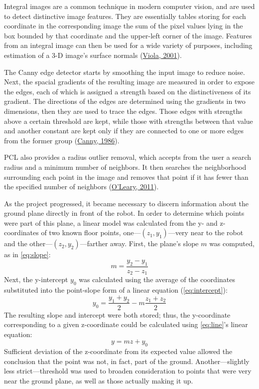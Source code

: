 \documentclass[12pt]{report}
\begin{document}
Integral images are a common technique in modern computer vision, and are used to detect distinctive image features.  They are essentially tables storing for each coordinate in the corresponding image the sum of the pixel values lying in the box bounded by that coordinate and the upper-left corner of the image.  Features from an integral image can then be used for a wide variety of purposes, including estimation of a 3-D image's surface normals (\hyperref[bib:viola]{Viola, 2001}).

The Canny edge detector starts by smoothing the input image to reduce noise.  Next, the spacial gradients of the resulting image are measured in order to expose the edges, each of which is assigned a strength based on the distinctiveness of its gradient.  The directions of the edges are determined using the gradients in two dimensions, then they are used to trace the edges.  Those edges with strengths above a certain threshold are kept, while those with strengths between that value and another constant are kept only if they are connected to one or more edges from the former group (\hyperref[bib:canny]{Canny, 1986}).

PCL also provides a radius outlier removal, which accepts from the user a search radius and a minimum number of neighbors.  It then searches the neighborhood surrounding each point in the image and removes that point if it has fewer than the specified number of neighbors (\hyperref[bib:oleary]{O'Leary, 2011}).

As the project progressed, it became necessary to discern information about the ground plane directly in front of the robot.  In order to determine which points were part of this plane, a linear model was calculated from the y- and z-coordinates of two known floor points, one---$(z_1,y_1)$---very near to the robot and the other---$(z_2,y_2)$---farther away.  First, the plane's slope $m$ was computed, as in \autoref{eq:slope}:
\begin{equation}
\label{eq:slope}
m=\frac{y_2-y_1}{z_2-z_1}
\end{equation}
Next, the y-intercept $y_0$ was calculated using the average of the coordinates substituted into the point-slope form of a linear equation (\autoref{eq:intercept}):
\begin{equation}
\label{eq:intercept}
y_0=\frac{y_1+y_2}{2}-m\frac{z_1+z_2}{2}
\end{equation}
The resulting slope and intercept were both stored; thus, the y-coordinate corresponding to a given z-coordinate could be calculated using \autoref{eq:line}'s linear equation:
\begin{equation}
\label{eq:line}
y=mz+y_0
\end{equation}
Sufficient deviation of the z-coordinate from its expected value allowed the conclusion that the point was not, in fact, part of the ground.  Another---slightly less strict---threshold was used to broaden consideration to points that were very near the ground plane, as well as those actually making it up.
\end{document}
